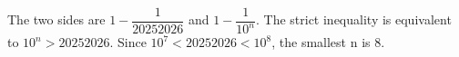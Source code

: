 The two sides are $1-\dfrac{1}{20252026}$ and $1-\dfrac{1}{10^n}$. The strict inequality is equivalent to $10^n>20252026$. Since $10^7<20252026<10^8$, the smallest n is $\boxed8$.
